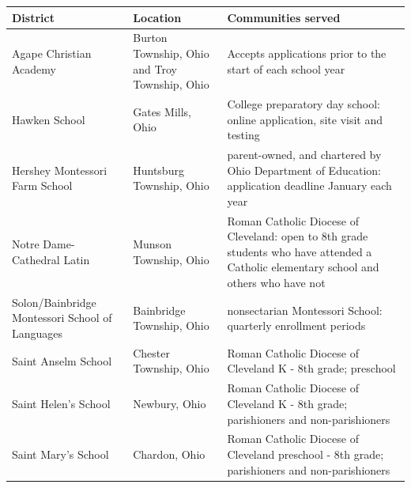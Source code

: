 \documentclass{article}
\begin{document}
\begin{tabular}{lll}
\toprule
District & Location & Communities served \\
\midrule
Agape Christian Academy & Burton Township, Ohio and Troy Township, Ohio & Accepts applications prior to the start of each school year \\
Hawken School & Gates Mills, Ohio & College preparatory day school: online application, site visit and testing \\
Hershey Montessori Farm School & Huntsburg Township, Ohio & parent-owned, and chartered by Ohio Department of Education: application deadline January each year \\
Notre Dame-Cathedral Latin & Munson Township, Ohio & Roman Catholic Diocese of Cleveland: open to 8th grade students who have attended a Catholic elementary school and others who have not \\
Solon/Bainbridge Montessori School of Languages & Bainbridge Township, Ohio & nonsectarian Montessori School: quarterly enrollment periods \\
Saint Anselm School & Chester Township, Ohio & Roman Catholic Diocese of Cleveland K - 8th grade; preschool \\
Saint Helen's School & Newbury, Ohio & Roman Catholic Diocese of Cleveland K - 8th grade; parishioners and non-parishioners \\
Saint Mary's School & Chardon, Ohio & Roman Catholic Diocese of Cleveland preschool - 8th grade; parishioners and non-parishioners \\
\bottomrule
\end{tabular}
\end{document}
